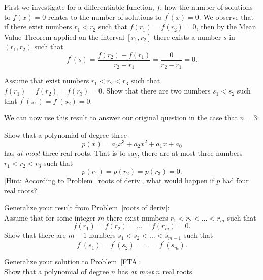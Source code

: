 \documentclass[10pt]{amsart}
\begin{document}



First we investigate for a differentiable function, \(f\), how the number of solutions to \(f(x) = 0\) relates to the number of solutions to \(f^\prime(x) = 0\).
We observe that if there exist numbers \(r_1 < r_2\) such that \(f(r_1) = f(r_2) = 0\), then by the Mean Value Theorem applied on the interval \([r_1, r_2]\) there exists a number \(s\) in \((r_1, r_2)\) such that
\[f^\prime(s) = \frac{f(r_2) - f(r_1)}{r_2 - r_1} = \frac{0}{r_2 - r_1} = 0.\]

\begin{thm}\label{roots of deriv}
  Assume that exist numbers \(r_1 < r_2 < r_3\) such that \(f(r_1) = f(r_2) = f(r_3) = 0\).
  Show that there are two numbers \(s_1 < s_2\) such that \(f^\prime(s_1) = f^\prime(s_2) = 0\).
\end{thm}
\newpage

\noindent We can now use this result to answer our original question in the case that \(n = 3\):
\begin{thm}\label{FTA}
  Show that a polynomial of degree three
  \[p(x) = a_3x^3 + a_2x^2 + a_1x +a_0\]
  has \textit{at most} three real roots.
  That is to say, there are at most three numbers \(r_1 < r_2 < r_3\) such that
  \[p(r_1) = p(r_2) = p(r_3) = 0.\]
     {[Hint: According to Problem~\ref{roots of deriv}, what would happen if \(p\) had four real roots?]}
\end{thm}

\vspace{2in}

\begin{thm}
  Generalize your result from Problem~\ref{roots of deriv}:\\

  \noindent Assume that for some integer \(m\) there exist numbers
  \(r_1 < r_2 < \ldots < r_m\)
    such that
    \[f(r_1) = f(r_2) = \ldots = f(r_m) = 0.\]
    Show that there are \(m-1\) numbers
    \(s_1 < s_2 < \ldots < s_{m-1}\)
    such that
    \[f^\prime(s_1) = f^\prime(s_2) = \ldots = f^\prime(s_m).\]
\end{thm}
\newpage
\begin{thm}
  Generalize your solution to Problem~\ref{FTA}:\\
  
  \noindent Show that a polynomial of degree \(n\) has \textit{at most} \(n\) real roots.
\end{thm}
\end{document}
